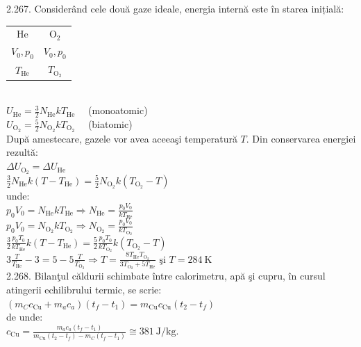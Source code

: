 2.267. Considerând cele două gaze ideale, energia internă este în starea inițială:\\ \begin{center} \begin{tabular}{|c|c|} \hline He & $\mathrm{O}_{2}$ \\ $V_{0}, p_{0}$ & $V_{0}, p_{0}$ \\ $T_{\mathrm{He}}$ & $T_{\mathrm{O}_{2}}$ \\ \hline \end{tabular} \end{center}\\ $U_{\mathrm{He}}=\frac{3}{2} N_{\mathrm{He}} k T_{\mathrm{He}} \quad$ (monoatomic)\\ $U_{\mathrm{O}_{2}}=\frac{5}{2} N_{\mathrm{O}_{2}} k T_{\mathrm{O}_{2}} \quad$ (biatomic)\\ După amestecare, gazele vor avea aceeaşi temperatură $T$. Din conservarea energiei rezultă:\\ $\Delta U_{\mathrm{O}_{2}}=\Delta U_{\mathrm{He}}$\\ $\frac{3}{2} N_{\mathrm{He}} k\left(T-T_{\mathrm{He}}\right)=\frac{5}{2} N_{\mathrm{O}_{2}} k\left(T_{\mathrm{O}_{2}}-T\right)$\\ unde:\\ $p_{0} V_{0}=N_{\mathrm{He}} k T_{\mathrm{He}} \Rightarrow N_{\mathrm{He}}=\frac{p_{0} V_{0}}{k T_{\mathrm{He}}}$\\ $p_{0} V_{0}=N_{\mathrm{O}_{2}} k T_{\mathrm{O}_{2}} \Rightarrow N_{\mathrm{O}_{2}}=\frac{p_{0} V_{0}}{k T_{\mathrm{O}_{2}}}$\\ $\frac{3}{2} \frac{p_{0} T_{0}}{k T_{\mathrm{He}}} k\left(T-T_{\mathrm{He}}\right)=\frac{5}{2} \frac{p_{0} T_{0}}{k T_{\mathrm{O}_{2}}} k\left(T_{\mathrm{O}_{2}}-T\right)$\\ $3 \frac{T}{T_{\mathrm{He}}}-3=5-5 \frac{T}{T_{\mathrm{O}_{2}}} \Rightarrow T=\frac{8 T_{\mathrm{He}} T_{\mathrm{O}_{2}}}{3 T_{\mathrm{O}_{2}}+5 T_{\mathrm{He}}} \text { şi } T=284 \mathrm{~K}$\\

2.268. Bilanţul căldurii schimbate între calorimetru, apă şi cupru, în cursul atingerii echilibrului termic, se scrie:\\ $\left(m_{C} c_{\mathrm{Cu}}+m_{a} c_{a}\right)\left(t_{f}-t_{1}\right)=m_{\mathrm{Cu}} c_{\mathrm{Cu}}\left(t_{2}-t_{f}\right)$\\ de unde:\\ $c_{\mathrm{Cu}}=\frac{m_{a} c_{a}\left(t_{f}-t_{1}\right)}{m_{\mathrm{Cu}}\left(t_{2}-t_{f}\right)-m_{C}\left(t_{f}-t_{1}\right)} \cong 381 \mathrm{~J} / \mathrm{kg}$.\\

